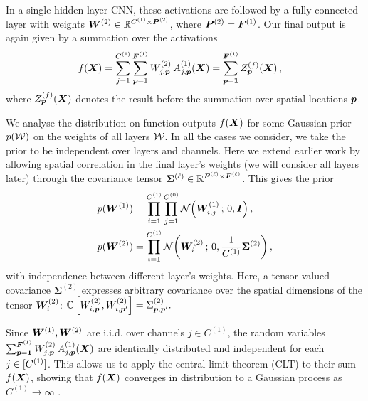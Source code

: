 \documentclass[accepted]{uai2021} %
\newcommand{\layerAs}[2]{Z^{(#1)}_{#2}(\vX)}
\newcommand{\layerC}[1]{C^{(#1)}}
\newcommand{\layerNLAs}[2]{A^{(#1)}_{#2}(\vX)}
\newcommand{\layerWs}[1]{W^{(#1)}}
\newcommand{\layerW}[1]{\mW^{(#1)}}
\newcommand{\layersizebase}{\vF}
\newcommand{\layersize}[1]{{\layersizebase^{\bra{#1}}}}
\newcommand{\patchsizebase}{\vP}
\newcommand{\patchsize}[1]{{\patchsizebase^{\bra{#1}}}}
\newcommand{\priorWcovs}[1]{\Sigma^{(#1)}}
\newcommand{\priorWcov}[1]{\boldsymbol{\Sigma}^{(#1)}}
\newcommand{\chan}{i}
\newcommand{\prevchan}{j}   %
\newcommand{\patch}{\vp}               %
\newcommand{\0}{\boldsymbol{0}}
\newcommand{\1}{\boldsymbol{1}}
\begin{document}
In a single hidden layer CNN, these activations are followed by a fully-connected layer with weights $\layerW{2} \in \sR^{\layerC 1\times \patchsize{2}}$, where $\patchsize{2} = \layersize{1}$. Our final output is again given by a summation over the activations
\begin{align}
  f(\mX) &= \sum_{\prevchan=1}^{\layerC{1}} \sum_{\patch=1}^{\layersize{1}} \layerWs{2}_{\prevchan,\patch}\, \layerNLAs{1}{\prevchan,\patch}
         = \sum_{\patch=\1}^{\layersize{1}} \layerAs{f}{\patch}
        \label{eq:single-layer-f} \,,
\end{align}
where $\layerAs{f}{\patch}$ denotes the result before the summation over spatial locations $\patch$.

We analyse the distribution on function outputs $f({\bm{X}})$ for some Gaussian prior
$p({\mathcal{W}})$ on the weights of all layers ${\mathcal{W}}$. In all the cases
we consider, we take the prior to be independent over layers and channels. Here
we extend earlier work by allowing spatial correlation in the final layer's
weights (we will consider all layers later) through the covariance tensor
$\priorWcov{\ell} \in \sR^{\layersize{\ell}\times\layersize{\ell}}$. This gives
the prior
\begin{align}
    p(\layerW1) &= \prod_{\chan=1}^{\layerC1}\prod_{\prevchan=1}^{\layerC0}\Normal{\layerW1_{\chan,\prevchan}\,;\, 0, \eye} \,, \\
     p(\layerW2) &= \prod_{\chan=1}^{\layerC1} \Normal{\layerW2_{\chan}\,;\, 0, \frac{1}{\layerC1}\priorWcov2} \,,
\end{align}
with independence between different layer's weights.
Here, a tensor-valued covariance $\priorWcov2$ expresses arbitrary covariance over the spatial dimensions of the tensor $\layerW{2}_{\chan}$: $\Cov\sqb{\layerWs{2}_{\chan,\patch},\layerWs{2}_{\chan,\patch'}} = \priorWcovs{2}_{\patch,\patch'}.$

Since $\layerW1,\layerW2$ are i.i.d. over channels $\prevchan\in\layerC{1}$, the random variables
$\sum_{\patch=\1}^{\layersize{1}}  \layerWs{2}_{\prevchan,\patch}\, \layerNLAs{1}{\prevchan,\patch}$ are identically distributed and independent for each $\prevchan \in \countto{\layerC{1}}$.
This allows us to apply the central limit theorem (CLT) to their sum $f({\bm{X}})$, showing that $f({\bm{X}})$ converges in distribution to a Gaussian process as $\layerC1\to\infty$ \citep{neal1996bayesian}.
\end{document}
